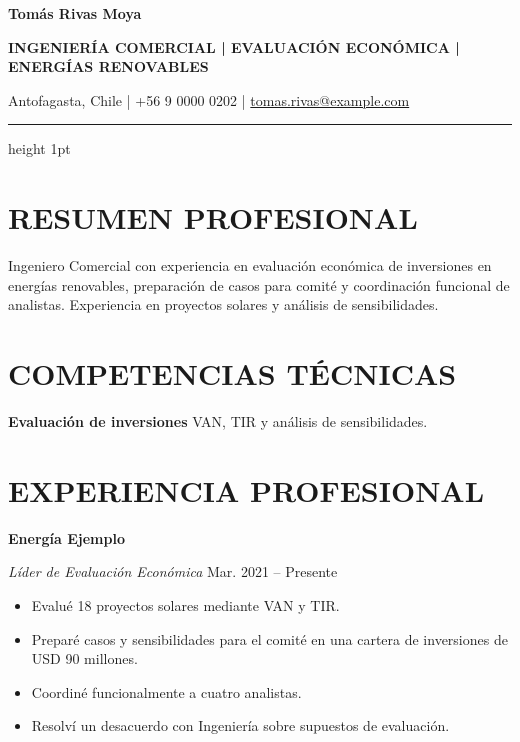 \documentclass[10pt,a4paper]{article}
\newcommand{\entidad}[2]{%
    \noindent
    \textbf{#1}\hfill
    {\small\color{secundario}#2}\par
}
\newcommand{\cargo}[2]{%
    \noindent
    \textit{#1}\enspace
    {\small\color{secundario}#2}\par
}
\newcommand{\detalle}[2]{%
    \noindent
    \textbf{#1} #2\par
    \vspace{2pt}
}
\begin{document}
\fontsize{9.2}{11}\selectfont
\color{texto}

\begin{center}
    {\fontsize{23}{27}\selectfont
     \bfseries\color{principal}Tomás Rivas Moya\par}

    \vspace{4pt}

    {\fontsize{9.5}{12}\selectfont
     \bfseries
     INGENIERÍA COMERCIAL | EVALUACIÓN ECONÓMICA | ENERGÍAS RENOVABLES
     \par}

    \vspace{5pt}

    {\fontsize{8.5}{10.5}\selectfont\color{secundario}
     Antofagasta, Chile \quad | \quad +56 9 0000 0202 \quad | \quad
     \href{mailto:tomas.rivas@example.com}{tomas.rivas@example.com}
     \par}
\end{center}

\vspace{-3pt}
{\color{principal}\hrule height 1pt}
\vspace{2pt}

\section{RESUMEN PROFESIONAL}

Ingeniero Comercial con experiencia en evaluación económica de inversiones en
energías renovables, preparación de casos para comité y coordinación funcional
de analistas. Experiencia en proyectos solares y análisis de sensibilidades.

\section{COMPETENCIAS TÉCNICAS}

\detalle{Evaluación de inversiones}{VAN, TIR y análisis de sensibilidades.}

\section{EXPERIENCIA PROFESIONAL}

\entidad{Energía Ejemplo}{}
\cargo{Líder de Evaluación Económica}{Mar. 2021 -- Presente}

\begin{itemize}
    \item Evalué 18 proyectos solares mediante VAN y TIR.
    \item Preparé casos y sensibilidades para el comité en una cartera de inversiones de USD 90 millones.
    \item Coordiné funcionalmente a cuatro analistas.
    \item Resolví un desacuerdo con Ingeniería sobre supuestos de evaluación.
\end{itemize}
\end{document}
